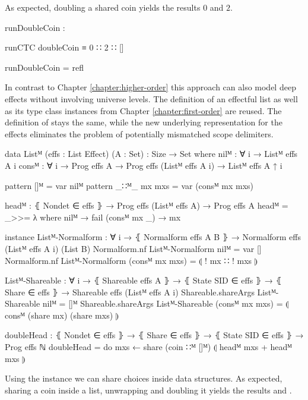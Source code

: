 As expected, doubling a shared coin yields the results $0$ and $2$.
\begin{center}
\begin{code}
runDoubleCoin :
\end{code}
\begin{code}[inline]
 runCTC doubleCoin ≡ 0 ∷ 2 ∷ []
\end{code}
\begin{code}
runDoubleCoin = refl
\end{code}
\end{center}
In contrast to Chapter \ref{chapter:higher-order} this approach can also model
deep effects without involving universe levels.
The definition of an effectful list as well as its type class instances from
Chapter \ref{chapter:first-order} are reused.
The definition of  stays the same, while the new
underlying representation for the effects eliminates the problem of potentially
mismatched scope delimiters.

\begin{code}[hide]
data Listᴹ (effs : List Effect) (A : Set) : {Size} → Set where
  nilᴹ  : ∀ {i} → Listᴹ effs A {i}
  consᴹ : ∀ {i} → Prog effs A → Prog effs (Listᴹ effs A {i}) → Listᴹ effs A {↑ i}

pattern []ᴹ         = var nilᴹ
pattern _∷ᴹ_ mx mxs = var (consᴹ mx mxs)

headᴹ : ⦃ Nondet ∈ effs ⦄ → Prog effs (Listᴹ effs A) → Prog effs A
headᴹ = _>>= λ where
  nilᴹ         → fail
  (consᴹ mx _) → mx

instance
  Listᴹ-Normalform : ∀ {i} → ⦃ Normalform effs A B ⦄ → Normalform effs (Listᴹ effs A {i}) (List B)
  Normalform.nf Listᴹ-Normalform nilᴹ           = var []
  Normalform.nf Listᴹ-Normalform (consᴹ mx mxs) = ⦇ ! mx ∷ ! mxs ⦈

  Listᴹ-Shareable : ∀ {i} → ⦃ Shareable effs A ⦄ → ⦃ State SID ∈ effs ⦄ → ⦃ Share ∈ effs ⦄ → Shareable effs (Listᴹ effs A {i})
  Shareable.shareArgs Listᴹ-Shareable nilᴹ           = []ᴹ
  Shareable.shareArgs Listᴹ-Shareable (consᴹ mx mxs) = ⦇ consᴹ (share mx) (share mxs) ⦈
\end{code}
\begin{code}
doubleHead : ⦃ Nondet ∈ effs ⦄ → ⦃ Share ∈ effs ⦄ → ⦃ State SID ∈ effs ⦄ →
  Prog effs ℕ
doubleHead = do mxs ← share (coin ∷ᴹ []ᴹ)
                ⦇ headᴹ mxs + headᴹ mxs ⦈
\end{code}
Using the  instance we can share choices inside data
structures.
As expected, sharing a coin inside a list, unwrapping and doubling it yields the
results  and .

